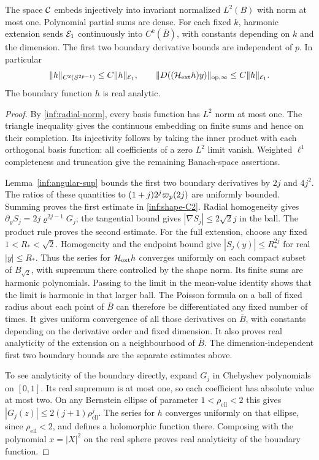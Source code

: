 \begin{lemma}\label{inf:space-embedding}
The space $\mathcal C$ embeds injectively into invariant normalized
$L^2(B)$ with norm at most one. Polynomial partial sums are dense.
For each fixed $k$, harmonic extension sends $\mathcal E_1$ continuously
into $C^k(\overline B)$, with constants depending on $k$ and the
dimension. The first two boundary derivative bounds are independent
of $p$.
In particular
\begin{equation}\label{inf:shape-C2}
 \lVert h\rVert_{C^2(S^{2p-1})}\le C\lVert h\rVert_{\mathcal E_1},\qquad
 \lVert D((\mathcal H_{\mathrm{ext}} h)y)\rVert_{\mathrm{op},\infty}\le C\lVert h\rVert_{\mathcal E_1}.
\end{equation}
The boundary function $h$ is real analytic.
\end{lemma}
\begin{proof}
By \eqref{inf:radial-norm}, every basis function has $L^2$ norm at
most one. The triangle inequality gives the continuous embedding
on finite sums and hence on their completion. Its injectivity
follows by taking the inner product with each orthogonal basis
function: all coefficients of a zero $L^2$ limit vanish.
Weighted $\ell^1$ completeness and truncation give the remaining
Banach-space assertions.

Lemma~\ref{inf:angular-sup} bounds the first two boundary
derivatives by $2j$ and $4j^2$. The ratios of these quantities to
$(1+j)2^j\varpi_p(2j)$ are uniformly bounded. Summing proves the first
estimate in \eqref{inf:shape-C2}. Radial homogeneity gives
$\partial_\varrho S_j=2j\varrho^{2j-1}G_j$;
the tangential bound gives $|\nabla S_j|\le2\sqrt2j$ in the ball.
The product rule proves the second estimate.
For the full extension, choose any fixed $1<R_*<\sqrt2$.
Homogeneity and the endpoint bound give
$|S_j(y)|\le R_*^{2j}$ for real $|y|\le R_*$.
Thus the series for $\mathcal H_{\mathrm{ext}} h$ converges uniformly on each compact
subset of $B_{\sqrt2}$, with supremum there controlled by the
shape norm. Its finite sums are harmonic polynomials. Passing
to the limit in the mean-value identity shows that the limit is
harmonic in that larger ball. The Poisson formula on a ball of
fixed radius about each point of $\overline B$ can therefore be
differentiated any fixed number of times. It gives uniform
convergence of all those derivatives on $\overline B$, with
constants depending on the derivative order and fixed dimension.
It also proves real analyticity of the extension on a
neighbourhood of $\overline B$. The dimension-independent first
two boundary bounds are the separate estimates above.

To see analyticity of the boundary directly, expand $G_j$ in
Chebyshev polynomials on $[0,1]$. Its real supremum is at most one,
so each coefficient has absolute value at most two. On any
Bernstein ellipse of parameter $1<\rho_{\mathrm{ell}}<2$ this gives
$|G_j(z)|\le2(j+1)\rho_{\mathrm{ell}}^j$.
The series for $h$ converges uniformly on that ellipse, since
$\rho_{\mathrm{ell}}<2$, and defines a holomorphic function there. Composing
with the polynomial $x=|X|^2$ on the real sphere proves real
analyticity of the boundary function.
\end{proof}

